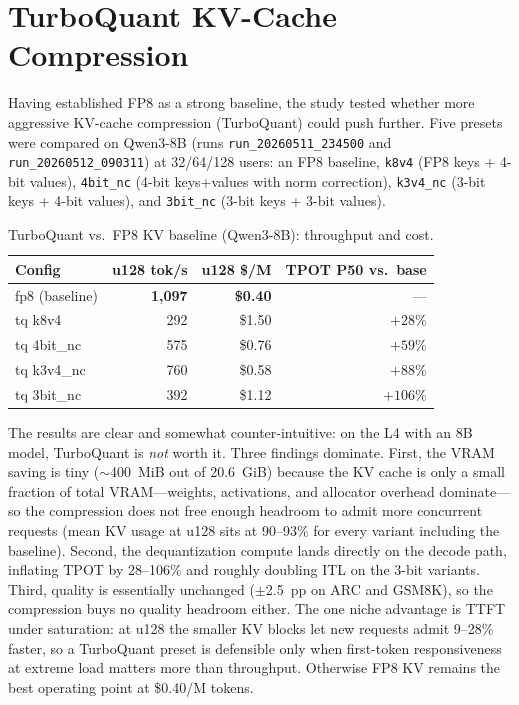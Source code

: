 \documentclass[a4paper,12pt]{report}
\begin{document}
\section{TurboQuant KV-Cache Compression}

Having established FP8 as a strong baseline, the study tested whether more aggressive KV-cache compression (TurboQuant) could push further. Five presets were compared on Qwen3-8B (runs \texttt{run\_20260511\_234500} and \texttt{run\_20260512\_090311}) at 32/64/128 users: an FP8 baseline, \texttt{k8v4} (FP8 keys + 4-bit values), \texttt{4bit\_nc} (4-bit keys+values with norm correction), \texttt{k3v4\_nc} (3-bit keys + 4-bit values), and \texttt{3bit\_nc} (3-bit keys + 3-bit values).

\begin{table}[htbp]
\caption{TurboQuant vs.\ FP8 KV baseline (Qwen3-8B): throughput and cost.}
\centering
\begin{tabular}{|l|r|r|r|}
\hline
\textbf{Config} & \textbf{u128 tok/s} & \textbf{u128 \$/M} & \textbf{TPOT P50 vs.\ base} \\
\hline
fp8 (baseline) & \textbf{1{,}097} & \textbf{\$0.40} & --- \\
tq k8v4 & 292 & \$1.50 & $+28\%$ \\
tq 4bit\_nc & 575 & \$0.76 & $+59\%$ \\
tq k3v4\_nc & 760 & \$0.58 & $+88\%$ \\
tq 3bit\_nc & 392 & \$1.12 & $+106\%$ \\
\hline
\end{tabular}
\label{table:turboquant}
\end{table}

The results are clear and somewhat counter-intuitive: on the L4 with an 8B model, TurboQuant is \emph{not} worth it. Three findings dominate. First, the VRAM saving is tiny ($\sim$400~MiB out of 20.6~GiB) because the KV cache is only a small fraction of total VRAM---weights, activations, and allocator overhead dominate---so the compression does not free enough headroom to admit more concurrent requests (mean KV usage at u128 sits at 90--93\% for every variant including the baseline). Second, the dequantization compute lands directly on the decode path, inflating TPOT by 28--106\% and roughly doubling ITL on the 3-bit variants. Third, quality is essentially unchanged ($\pm$2.5~pp on ARC and GSM8K), so the compression buys no quality headroom either. The one niche advantage is TTFT under saturation: at u128 the smaller KV blocks let new requests admit 9--28\% faster, so a TurboQuant preset is defensible only when first-token responsiveness at extreme load matters more than throughput. Otherwise FP8 KV remains the best operating point at \$0.40/M tokens.
\end{document}
